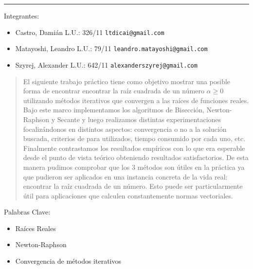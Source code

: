 \rule{\linewidth}{0.5mm}

\vspace{2cm}

Integrantes:
\begin{itemize}
	\item Castro, Dami\'an L.U.: 326/11  \verb+ltdicai@gmail.com+
	\item Matayoshi, Leandro L.U.: 79/11 \verb+leandro.matayoshi@gmail.com+
	\item Szyrej, Alexander L.U.: 642/11   \verb+alexanderszyrej@gmail.com+
	
\end{itemize}

\vspace{2cm}

\begin{abstract}
  El siguiente trabajo práctico tiene como objetivo mostrar una posible forma de encontrar encontrar la raíz cuadrada de un número $\alpha \geq 0$
  utilizando métodos iterativos que convergen a las raíces de funciones reales. Bajo este marco implementamos los algoritmos de Bisección, Newton-Raphson
  y Secante y luego realizamos distintas experimentaciones focalizándonos en distintos aspectos: convergencia o no a la solución buscada, criterios de
  para utilizados, tiempo consumido por cada uno, etc. Finalmente contrastamos los resultados empíricos con lo que era esperable desde el punto de vista
  teórico obteniendo resultados satisfactorios. De esta manera pudimos comprobar que los 3 métodos son útiles en la práctica ya que pudieron
  ser aplicados en una instancia concreta de la vida real: encontrar la raíz cuadrada de un número. Esto puede ser particularmente útil para aplicaciones
  que calculen constantemente normas vectoriales.
\end{abstract}

\vspace{2cm}

Palabras Clave:
\begin{itemize}
	\item Ra\'ices Reales
	\item Newton-Raphson
	\item Convergencia de m\'etodos iterativos
\end{itemize}

